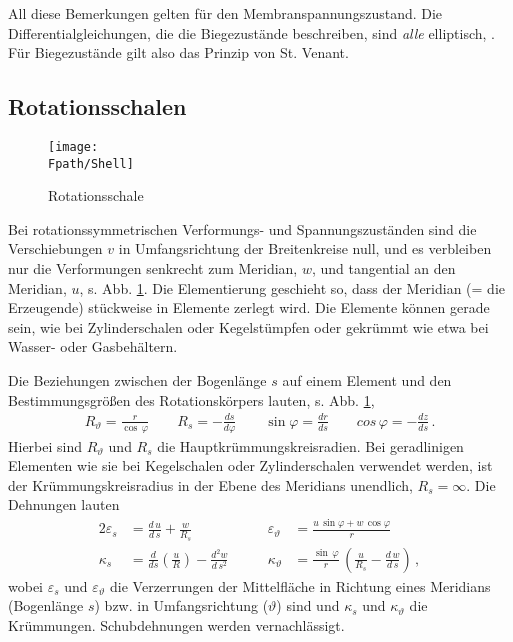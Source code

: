 All diese Bemerkungen gelten f\"{u}r den Membranspannungszustand. Die Differentialgleichungen, die die Biegezust\"{a}nde beschreiben, sind {\em alle\/} elliptisch, \cite{Pit}. F\"{u}r Biegezust\"{a}nde gilt also das Prinzip von St. Venant.

{\textcolor{sectionTitleBlue}{\section{Rotationsschalen}}}\label{Rotationsschalen}
\begin{figure}[tbp] \centering
\if {} \sidecaption \fi
\texttt{[image: \\Fpath/Shell]}
\caption{Rotationsschale}  \label{Shell}
\end{figure}%

Bei rotationssymmetrischen Verformungs- und Spannungszust\"{a}nden sind die Verschiebungen $v$ in Umfangsrichtung der Breitenkreise null, und es verbleiben nur die Verformungen senkrecht zum Meridian, $w$, und tangential an den Meridian, $u$, s. Abb. \ref{Shell}. Die Elementierung geschieht so, dass der Meridian (= die Erzeugende) st\"{u}ckweise in Elemente zerlegt wird. Die Elemente k\"{o}nnen gerade sein, wie bei Zylinderschalen oder Kegelst\"{u}mpfen oder gekr\"{u}mmt wie etwa bei Wasser- oder Gasbeh\"{a}ltern.

Die Beziehungen zwischen der Bogenl\"{a}nge $s$ auf einem Element und den Bestimmungsgr\"{o}{\ss}en
des Rotationsk\"{o}rpers lauten, s. Abb. \ref{Shell},
\begin{align}
R_\vartheta = \frac{r}{\cos\,\varphi} \qquad R_s = - \frac{d s}{d \varphi } \qquad \sin
\varphi = \frac{dr}{ds} \qquad cos\,\varphi = - \frac{dz}{ds}\,.
\end{align}
Hierbei sind $R_\vartheta$ und $R_s$ die Hauptkr\"{u}mmungskreisradien. Bei geradlinigen Elementen wie sie bei Kegelschalen oder Zylinderschalen verwendet werden, ist der Kr\"{u}mmungskreisradius in der Ebene des Meridians unendlich, $R_s = \infty$. Die Dehnungen lauten
\begin{alignat}{2}
\varepsilon_{s} &= \frac{d\,u}{d\,s} + \frac{w}{R_s} \qquad& \varepsilon_{\vartheta} &=
\frac{u\,\sin \varphi
+ w\,\cos \varphi}{r}\\
\kappa_s &= \frac{d}{ds} \left(\frac{u}{R}\right) - \frac{d^2 w}{d\,s^2}\qquad
&\kappa_\vartheta &= \frac{\sin\,\varphi  }{r}\,\left(\frac{u}{R_s} - \frac{d\,w}{d\,s}
\right)\,,
\end{alignat}
wobei $\varepsilon_{s}$ und $\varepsilon_{\vartheta}$ die Verzerrungen der Mittelfl\"{a}che in Richtung eines Meridians (Bogenl\"{a}nge $s$) bzw. in Umfangsrichtung ($\vartheta$) sind und $\kappa_s$ und $\kappa_\vartheta$ die Kr\"{u}mmungen. Schubdehnungen werden vernachl\"{a}ssigt.

